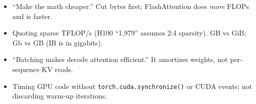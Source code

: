 \begin{trap}
\begin{itemize}
\item ``Make the math cheaper.'' Cut bytes first; FlashAttention does \emph{more} FLOPs and is faster.
\item Quoting sparse TFLOP/s (H100 ``1{,}979'' assumes 2:4 sparsity). GB vs GiB; Gb vs GB (IB is in gigabits).
\item ``Batching makes decode attention efficient.'' It amortizes weights, not per-sequence KV reads.
\item Timing GPU code without \texttt{torch.cuda.synchronize()} or CUDA events; not discarding warm-up iterations.
\end{itemize}
\end{trap}
